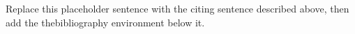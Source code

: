 \documentclass{article}
\begin{document}
Replace this placeholder sentence with the citing sentence described
above, then add the thebibliography environment below it.
\end{document}
